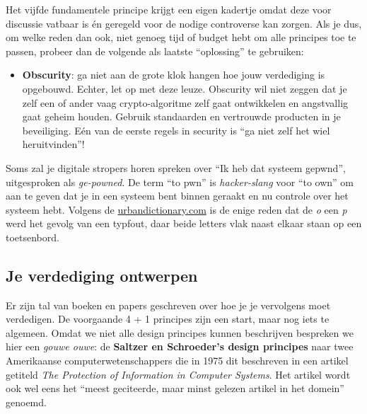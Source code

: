 \documentclass[
  10pt,
  dutch,
  paper=a4,
  ,captions=tableheading
]{scrbook}
\providecommand{\tightlist}{%
  \setlength{\itemsep}{0pt}\setlength{\parskip}{0pt}}
\begin{document}
\begin{cautionblock}
Het vijfde fundamentele principe krijgt een eigen kadertje omdat deze
voor discussie vatbaar is én geregeld voor de nodige controverse kan
zorgen. Als je dus, om welke reden dan ook, niet genoeg tijd of budget
hebt om alle principes toe te passen, probeer dan de volgende als
laatste ``oplossing'' te gebruiken:

\begin{itemize}
\tightlist
\item
  \textbf{Obscurity}: ga niet aan de grote klok hangen hoe jouw
  verdediging is opgebouwd. Echter, let op met deze leuze. Obscurity wil
  niet zeggen dat je zelf een of ander vaag crypto-algoritme zelf gaat
  ontwikkelen en angstvallig gaat geheim houden. Gebruik standaarden en
  vertrouwde producten in je beveiliging. Eén van de eerste regels in
  security is ``ga niet zelf het wiel heruitvinden''!
\end{itemize}

\end{cautionblock}

\begin{tipblock}
Soms zal je digitale stropers horen spreken over ``Ik heb dat systeem
gepwnd'', uitgesproken als \emph{ge-powned}. De term ``to pwn'' is
\emph{hacker-slang} voor ``to own'' om aan te geven dat je in een
systeem bent binnen geraakt en nu controle over het systeem hebt.
Volgens de
\href{https://www.urbandictionary.com/define.php?term=pwnd}{urbandictionary.com}
is de enige reden dat de \emph{o} een \emph{p} werd het gevolg van een
typfout, daar beide letters vlak naast elkaar staan op een toetsenbord.
\end{tipblock}

\subsection{Je verdediging ontwerpen}\label{je-verdediging-ontwerpen}

Er zijn tal van boeken en papers geschreven over hoe je je vervolgens
moet verdedigen. De voorgaande 4 + 1 principes zijn een start, maar nog
iets te algemeen. Omdat we niet alle design principes kunnen beschrijven
bespreken we hier een \emph{gouwe ouwe}: de \textbf{Saltzer en
Schroeder's design principes} naar twee Amerikaanse
computerwetenschappers die in 1975 dit beschreven in een artikel
getiteld \emph{The Protection of Information in Computer Systems}. Het
artikel wordt ook wel eens het ``meest geciteerde, maar minst gelezen
artikel in het domein'' genoemd.
\end{document}
